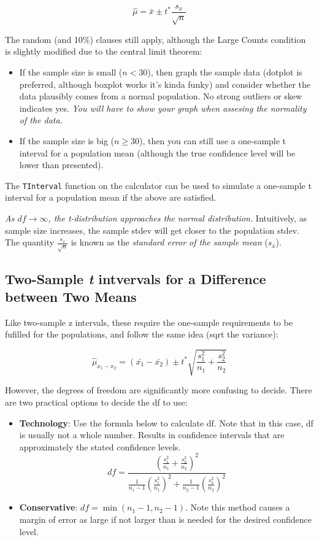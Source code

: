 \documentclass[12pt, a4paper]{article}
\theoremstyle{definition}
\begin{document}
\[\hat{\mu} = \bar{x} \pm t^{*}\frac{s_x}{\sqrt{n}}\]

The random (and 10\%) clauses still apply, although the Large Counts condition is slightly modified due to the central limit theorem:
\begin{itemize}
    \item If the sample size is small ($n < 30$), then graph the sample data (dotplot is preferred, although boxplot works it's kinda funky) and consider whether the data plausibly comes from a normal population.
    No strong outliers or skew indicates yes. \textit{You will have to show your graph when assesing the normality of the data.}
    \item If the sample size is big ($n \geq 30$), then you can still use a one-sample t interval for a population mean (although the true confidence level will be lower than presented).
\end{itemize}

The \verb|TInterval| function on the calculator can be used to simulate a one-sample t interval for a population mean if the above are satisfied.

\textit{As $df \rightarrow \infty$, the t-distribution approaches the normal distribution.}
Intuitively, as sample size increases, the sample stdev will get closer to the population stdev.
The quantity $\frac{s_x}{\sqrt{n}}$ is known as the \textit{standard error of the sample mean} ($s_{\bar{x}}$).

\subsection{Two-Sample \textit{t} intvervals for a Difference between Two Means}

Like two-sample z intervals, these require the one-sample requirements to be fufilled for the populations, and follow the same idea (sqrt the variance):

\[\hat{\mu}_{x_1 - x_2} = (\bar{x_1} - \bar{x_2}) \pm t^{*}\sqrt{\frac{s_1^2}{n_1}+\frac{s_2^2}{n_2}}\]

However, the degrees of freedom are significantly more confusing to decide. There are two practical options to decide the df to use:
\begin{itemize}
    \item \textbf{Technology}: Use the formula below to calculate df. Note that in this case, df is usually not a whole number.
    Results in confidence intervals that are approximately the stated confidence levels.
    \[df = \frac{{(\frac{s_1^2}{n_1} + \frac{s_2^2}{n_2})}^2}{\frac{1}{n_1 - 1} {(\frac{s_1^2}{n_1})}^2 + \frac{1}{n_2 - 1} {(\frac{s_2^2}{n_2})}^2}\] %

    \item \textbf{Conservative}: $df = \min{(n_1 - 1, n_2 - 1)}$.
    Note this method causes a margin of error as large if not larger than is needed for the desired confidence level.
\end{itemize}
\end{document}

